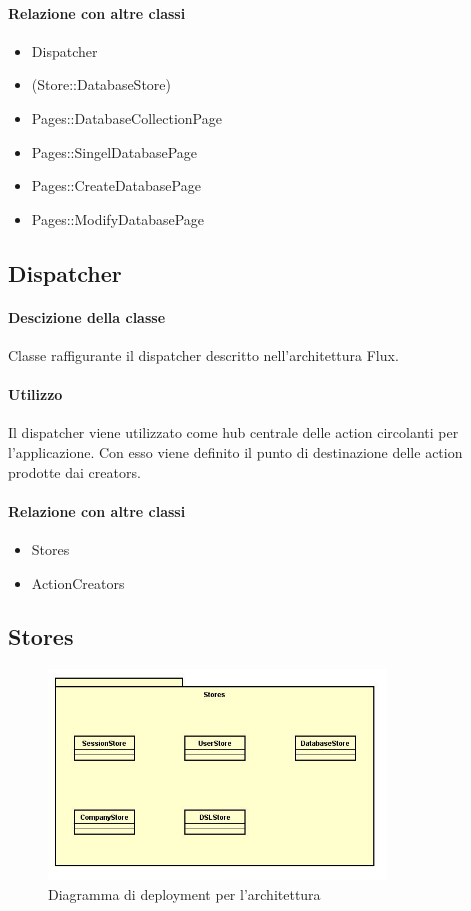 \paragraph*{Relazione con altre classi}
\begin{itemize}
\item Dispatcher
\item (Store::DatabaseStore)
\item Pages::DatabaseCollectionPage
\item Pages::SingelDatabasePage
\item Pages::CreateDatabasePage
\item Pages::ModifyDatabasePage
\end{itemize}

\subsection{Dispatcher}
\paragraph*{Descizione della classe}
Classe raffigurante il dispatcher descritto nell'architettura Flux.
\paragraph*{Utilizzo}
Il dispatcher viene utilizzato come hub centrale delle action circolanti per l'applicazione. Con esso viene definito il punto di destinazione delle action prodotte dai creators.
\paragraph*{Relazione con altre classi}
\begin{itemize}
\item Stores
\item ActionCreators
\end{itemize}


\subsection{Stores}

\begin{figure}[h]
\centering
\includegraphics[width=0.8\textwidth]{res/sections/imgs/stores-diagram.jpg}
\caption{Diagramma di deployment per l'architettura}
\end{figure}

